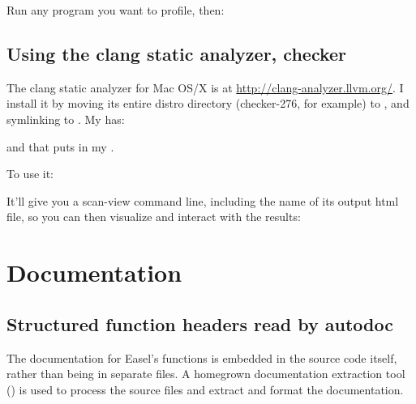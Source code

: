 Run any program you want to profile, then:

\begin{cchunk}
\end{cchunk}

\subsection{Using the clang static analyzer, checker}

The clang static analyzer for Mac OS/X is at
\url{http://clang-analyzer.llvm.org/}. I install it by moving its
entire distro directory (checker-276, for example) to
, and symlinking to .
My  has:


and that puts  in my .

To use it:

\begin{cchunk}
\end{cchunk}

It'll give you a scan-view command line, including the name of its
output html file, so you can then visualize and interact with the
results:

\begin{cchunk}
\end{cchunk}






\section{Documentation}

\subsection{Structured function headers read by autodoc}
The documentation for Easel's functions is embedded in the source code
itself, rather than being in separate files. A homegrown documentation
extraction tool () is used to process the source files
and extract and format the documentation.

